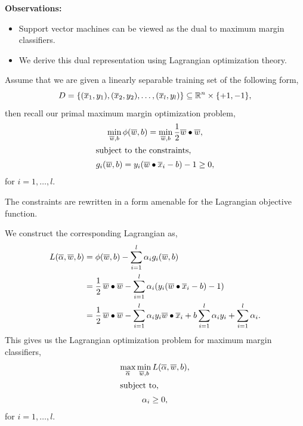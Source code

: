 \documentclass[a4paper,blends,pdf,colorBG,slideColor]{prosper}
\begin{document}

{\bf Observations:}

\begin{itemize}
\item Support vector machines can be viewed as the dual to maximum margin classifiers.
\item We derive this dual representation using Lagrangian optimization theory.
\end{itemize}
\es

Assume that we are given a linearly separable training set of the following form,
\begin{equation*}
D = \{(\overline{x}_1,y_1),(\overline{x}_2,y_2),\ldots,(\overline{x}_l,y_l)\} \subseteq \mathbb{R}^{n}\times\{+1, -1\},
\end{equation*}
then recall our primal maximum margin optimization problem,
\begin{gather*}
\min_{\overline{w},b}\phi(\overline{w},b) =\min_{\overline{w},b}\frac{1}{2}\overline{w}\bullet\overline{w},\\
\intertext{subject to the constraints,}
g_i(\overline{w},b) = y_i(\overline{w}\bullet\overline{x}_i -b) - 1\ge 0,
\end{gather*}
for $i = 1,\ldots,l$.

The constraints are rewritten in a form amenable for the Lagrangian objective function.

\es


We construct the corresponding Lagrangian as,
\begin{equation*}
\begin{aligned}
L(\overline{\alpha},\overline{w},b) &=  \phi(\overline{w},b) - \sum_{i=1}^l \alpha_i g_i(\overline{w},b) \\
& =  \frac{1}{2}\,\overline{w}\bullet\overline{w} - \sum_{i=1}^l \alpha_i (y_i(\overline{w}\bullet\overline{x}_i-b) - 1)\\
& =  \frac{1}{2}\,\overline{w}\bullet\overline{w} 
	- \sum_{i=1}^l \alpha_i y_i\overline{w}\bullet\overline{x}_i
	+ b\sum_{i=1}^l \alpha_i y_i
	+ \sum_{i=1}^l \alpha_i.
\end{aligned}
\end{equation*}
This gives us the Lagrangian optimization problem for maximum margin classifiers,
\begin{gather*}
\max_{\overline{\alpha}} \min_{\overline{w},b} L(\overline{\alpha},\overline{w},b) ,\\
\intertext{subject to,}
\alpha_i \ge 0,
\end{gather*}
for $i = 1, \ldots, l$.
\es
\end{document}
